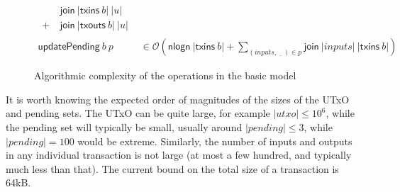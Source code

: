 \documentclass{article}
\newcommand{\order}[1]{\mathcal{O}\left(#1\right)}
\theoremstyle{definition}{
  \newtheorem{lemma}{Lemma}[section] %
  \newtheorem{definition}[lemma]{Definition}
}
\theoremstyle{theorem}{
  \newtheorem{invariant}[lemma]{Invariant}
  \newtheorem{proofobligation}[lemma]{Proof Obligation}
}
\numberwithin{equation}{lemma}
\begin{document}
\begin{figure}
\begin{equation*}
\begin{split}
{\begin{split}
                                & ~ \mathsf{join} ~ |\mathsf{txins}~ b| ~ |u| \\
                              + & ~ \mathsf{join} ~ |\mathsf{txouts}~ b| ~ |u|
                              \end{split}} \\
\mathsf{updatePending} ~ b ~ p & \in \order{\mathsf{nlogn} ~ |\mathsf{txins}~ b| + \sum_{(\mathit{inputs}, \,\underline{\phantom{a}}\,) \in p}{\mathsf{join} ~ |\mathit{inputs}| ~ |\mathsf{txins}~ b|}}
\end{split}
\end{equation*}
\caption{\label{fig:basic_model_complexity}Algorithmic complexity of the operations in the basic model}
\end{figure}

It is worth knowing the expected
order of magnitudes of the sizes of the UTxO and pending sets. The UTxO can be
quite large, for example $|\mathit{utxo}| \leq 10^6$, while the pending set will
typically be small, usually around $|\mathit{pending}| \leq 3$, while $|\mathit{pending}| = 100$
would be extreme. Similarly, the number of inputs and outputs in any individual
transaction is not large (at most a few hundred, and typically much less than that). The current bound on the total size of a transaction
is 64kB.

\end{document}
